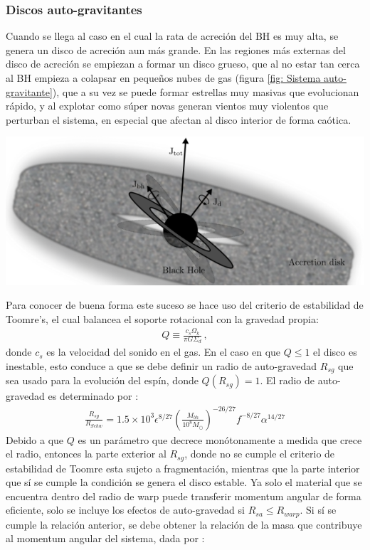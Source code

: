     \subsubsection{Discos auto-gravitantes}
    \label{subsubsec: Disco auto-gravitantes}
Cuando se llega al caso en el cual la rata de acreción del BH es muy alta, se genera un disco de acreción aun más grande. En las regiones más externas del disco de acreción se empiezan a formar un disco grueso, que al no estar tan cerca al BH empieza a colapsar en pequeños nubes de gas (figura \ref{fig: Sistema auto-gravitante}), que a su vez se puede formar estrellas muy masivas que evolucionan rápido, y al explotar como súper novas generan vientos muy violentos que perturban el sistema, en especial que afectan al disco interior de forma caótica. 
%
\begin{center}
\includegraphics[scale=.3]{./figures/4_Modelo_Spin/Sistema_auto-gravitante.png}
\label{fig: Sistema auto-gravitante}
\end{center}
%
Para conocer de buena forma este suceso se hace uso del criterio de estabilidad de Toomre's, el cual balancea  el soporte rotacional con la gravedad propia:
%
\begin{align}
    Q\equiv\frac{c_{s}\Omega_{k}}{\pi G\Sigma_{d}}\,,
    \label{eq: estabilidad_Toomre's}
\end{align}
%
donde $c_{s}$ es la velocidad del sonido en el gas. En el caso en que $Q\leq 1$ el disco es inestable, esto conduce a que se debe definir un radio de auto-gravedad $R_{sg}$ que sea usado para la evolución del espín, donde $Q(R_{sg})=1$. El radio de auto-gravedad es determinado por \cite{fanidakis2011}:
%
\begin{align}
    \frac{R_{sg}}{R_{Schw}}=1.5\times 10^{3}\epsilon^{8/27}\left(\frac{M_{bh}}{10^{8}M_{\odot}} \right)^{-26/27}f^{-8/27}\alpha^{14/27}
\end{align}
%
Debido a que $Q$ es un parámetro que decrece monótonamente a medida que crece el radio,  entonces la parte exterior al $R_{sg}$, donde no se cumple el criterio de estabilidad de Toomre esta sujeto a fragmentación, mientras que la parte interior que sí se cumple la condición se genera el disco estable. Ya solo el material que se encuentra dentro del radio de warp puede transferir momentum angular de forma eficiente, solo se incluye los efectos de auto-gravedad si $R_{sa}\leq R_{warp}$. Si sí se cumple la relación anterior, se debe obtener la relación de la masa que contribuye al momentum angular del sistema, dada por \cite{fanidakis2011}:
